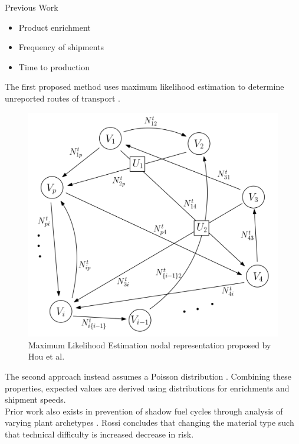 \documentclass[final]{beamer}
\newlength{\onecolwid}
\newlength{\threecolwid}
\begin{document}
\begin{frame}[t]
\begin{columns}[t,totalwidth=\threecolwid]
\begin{column}{\onecolwid}
\begin{block}{Previous Work}
\begin{itemize}
		\item Product enrichment
		\item Frequency of shipments
		\item Time to production
	\end{itemize}
The first proposed method uses maximum likelihood estimation to determine unreported routes of transport \cite{Hou_2016}. 
\begin{figure}
	\includegraphics{Hou_Network.png}
	\caption{Maximum Likelihood Estimation nodal representation proposed by Hou et al\cite{Hou_2016}.}
\end{figure}
The second approach instead assumes a Poisson distribution \cite{Yilmaz_2016}. Combining these properties, expected values are derived using distributions for enrichments and shipment speeds. \\
\vspace{10mm}
Prior work also exists in prevention of shadow fuel cycles through analysis of varying plant archetypes \cite{Rossi_2016}. Rossi concludes that changing the material type such that technical difficulty is increased decrease in risk.
\end{block}


\end{column} %


\end{columns}
\end{frame}
\end{document}
